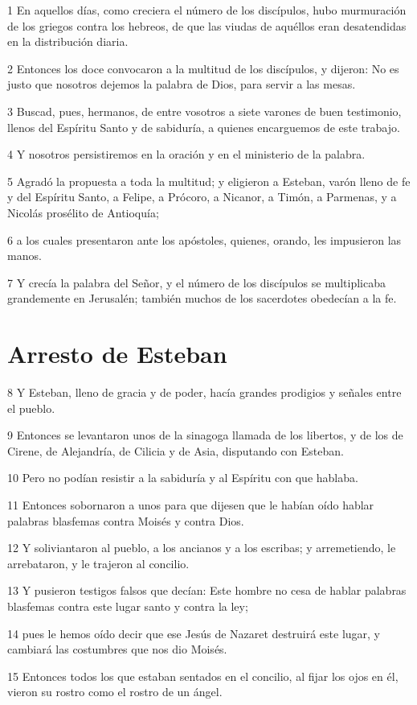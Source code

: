 \par 1 En aquellos días, como creciera el número de los discípulos, hubo murmuración de los griegos contra los hebreos, de que las viudas de aquéllos eran desatendidas en la distribución diaria.
\par 2 Entonces los doce convocaron a la multitud de los discípulos, y dijeron: No es justo que nosotros dejemos la palabra de Dios, para servir a las mesas.
\par 3 Buscad, pues, hermanos, de entre vosotros a siete varones de buen testimonio, llenos del Espíritu Santo y de sabiduría, a quienes encarguemos de este trabajo.
\par 4 Y nosotros persistiremos en la oración y en el ministerio de la palabra.
\par 5 Agradó la propuesta a toda la multitud; y eligieron a Esteban, varón lleno de fe y del Espíritu Santo, a Felipe, a Prócoro, a Nicanor, a Timón, a Parmenas, y a Nicolás prosélito de Antioquía;
\par 6 a los cuales presentaron ante los apóstoles, quienes, orando, les impusieron las manos.
\par 7 Y crecía la palabra del Señor, y el número de los discípulos se multiplicaba grandemente en Jerusalén; también muchos de los sacerdotes obedecían a la fe.

\section*{Arresto de Esteban}

\par 8 Y Esteban, lleno de gracia y de poder, hacía grandes prodigios y señales entre el pueblo.
\par 9 Entonces se levantaron unos de la sinagoga llamada de los libertos, y de los de Cirene, de Alejandría, de Cilicia y de Asia, disputando con Esteban.
\par 10 Pero no podían resistir a la sabiduría y al Espíritu con que hablaba.
\par 11 Entonces sobornaron a unos para que dijesen que le habían oído hablar palabras blasfemas contra Moisés y contra Dios.
\par 12 Y soliviantaron al pueblo, a los ancianos y a los escribas; y arremetiendo, le arrebataron, y le trajeron al concilio.
\par 13 Y pusieron testigos falsos que decían: Este hombre no cesa de hablar palabras blasfemas contra este lugar santo y contra la ley;
\par 14 pues le hemos oído decir que ese Jesús de Nazaret destruirá este lugar, y cambiará las costumbres que nos dio Moisés.
\par 15 Entonces todos los que estaban sentados en el concilio, al fijar los ojos en él, vieron su rostro como el rostro de un ángel.

